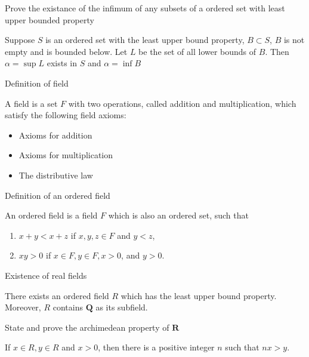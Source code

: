 \documentclass[11pt]{article}
\newcommand{\reals}{\mathbf{R}}
\newcommand{\rationals}{\mathbf{Q}}
\newcommand*{\xfield}[1]{\begin{mdframed}\centering #1\end{mdframed}\bigskip}
\newenvironment{field}{}{}
\newenvironment{note}{}{}
\begin{document}
%
\begin{note}
  \xfield{Prove the existance of the infimum of any subsets of a
    ordered set with least upper bounded property}
  \begin{field}
    Suppose \(S\) is an ordered set with the least upper bound
    property, \(B \subset S\), \(B\) is not empty and is bounded
    below. Let \(L\) be the set of all lower bounds of \(B\). Then
    \(\alpha = \sup L\) exists in \(S\) and \(\alpha = \inf B\)
  \end{field}
\end{note}
%
\begin{note}
  \xfield{Definition of field}
  \begin{field}
    A field is a set \(F\) with two operations, called addition and
    multiplication, which satisfy the following field axioms:
    \begin{itemize}
    \item Axioms for addition
    \item Axioms for multiplication
    \item The distributive law
    \end{itemize}
  \end{field}
\end{note}
%
\begin{note}
  \xfield{Definition of an ordered field}
  \begin{field}
    An ordered field is a field \(F\) which is also an ordered set,
    such that
    \begin{enumerate}
    \item \(x + y < x + z\) if \(x, y, z \in F\) and \(y < z\),
    \item \(xy > 0\) if \(x \in F, y \in F, x > 0\), and \(y > 0\).
    \end{enumerate}
  \end{field}
\end{note}
%
\begin{note}
  \xfield{Existence of real fields}
  \begin{field}
    There exists an ordered field \(R\) which has the least upper
    bound property. Moreover, \(R\) contains \(\rationals\) as its
    subfield.
  \end{field}
\end{note}
%
\begin{note}
  \xfield{State and prove the archimedean property of \(\reals\)}
  \begin{field}
    If \(x \in R, y \in R\) and \(x > 0\), then there is a positive
    integer \(n\) such that \(nx > y\).
  \end{field}
\end{note}
\end{document}
